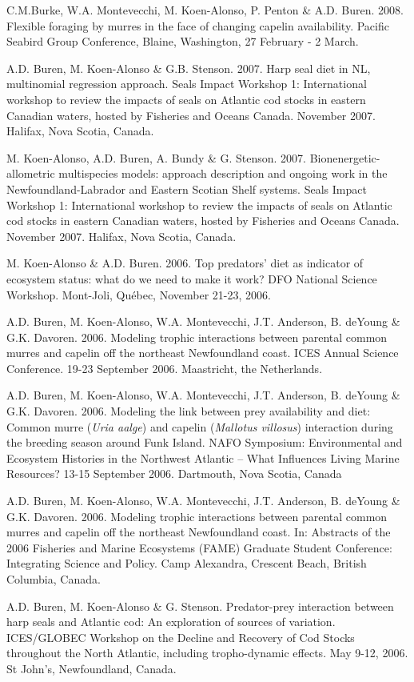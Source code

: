 \documentclass{res}
\begin{document}
\begin{resume}
\begin{hangparas}{.4in}{1}
C.M.Burke, W.A. Montevecchi, M. Koen-Alonso, P. Penton \& A.D. Buren. 2008. Flexible foraging by murres in the face of changing capelin availability. Pacific Seabird Group Conference, Blaine, Washington, 27 February - 2 March.

A.D. Buren, M. Koen-Alonso \& G.B. Stenson. 2007. Harp seal diet in NL, multinomial regression approach. Seals Impact Workshop 1: International workshop to review the impacts of seals on Atlantic cod stocks in eastern Canadian waters, hosted by Fisheries and Oceans Canada. November 2007. Halifax, Nova Scotia, Canada.

M. Koen-Alonso, A.D. Buren, A. Bundy \& G. Stenson. 2007. Bionenergetic-allometric multispecies models: approach description and ongoing work in the Newfoundland-Labrador and Eastern Scotian Shelf systems. Seals Impact Workshop 1: International workshop to review the impacts of seals on Atlantic cod stocks in eastern Canadian waters, hosted by Fisheries and Oceans Canada. November 2007. Halifax, Nova Scotia, Canada.

M. Koen-Alonso \& A.D. Buren. 2006. Top predators' diet as indicator of ecosystem status: what do we need to make it work? DFO National Science Workshop. Mont-Joli, Qu\'{e}bec, November 21-23, 2006.

A.D. Buren, M. Koen-Alonso, W.A. Montevecchi, J.T. Anderson, B. deYoung \& G.K. Davoren. 2006. Modeling trophic interactions between parental common murres and capelin off the northeast Newfoundland coast. ICES Annual Science Conference. 19-23 September 2006. Maastricht, the Netherlands.

A.D. Buren, M. Koen-Alonso, W.A. Montevecchi, J.T. Anderson, B. deYoung \& G.K. Davoren. 2006. Modeling the link between prey availability and diet: Common murre (\textit{Uria aalge}) and capelin (\textit{Mallotus villosus}) interaction during the breeding season around Funk Island. NAFO Symposium: Environmental and Ecosystem Histories in the Northwest Atlantic – What Influences Living Marine Resources? 13-15 September 2006. Dartmouth, Nova Scotia, Canada

A.D. Buren, M. Koen-Alonso, W.A. Montevecchi, J.T. Anderson, B. deYoung \& G.K. Davoren. 2006. Modeling trophic interactions between parental common murres and capelin off the northeast Newfoundland coast. In: Abstracts of the 2006 Fisheries and Marine Ecosystems (FAME) Graduate Student Conference: Integrating Science and Policy. Camp Alexandra, Crescent Beach, British Columbia, Canada.

A.D. Buren, M. Koen-Alonso \& G. Stenson. Predator-prey interaction between harp seals and Atlantic cod: An exploration of sources of variation. ICES/GLOBEC Workshop on the Decline and Recovery of Cod Stocks throughout the North Atlantic, including tropho-dynamic effects. May 9-12, 2006. St John's, Newfoundland, Canada.
 

\end{hangparas}
\end{resume}
\end{document}
